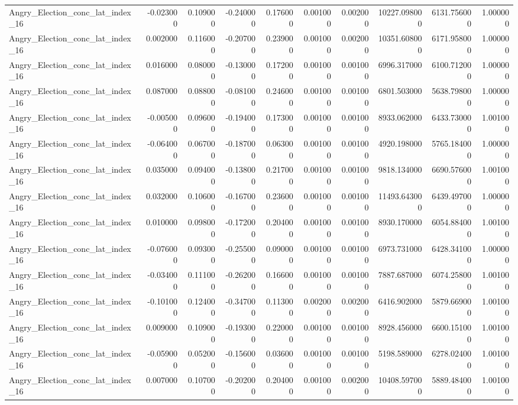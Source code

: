 \begin{table}
\begin{tabular}{lrrrrrrrrr}
Angry_Election_conc_lat_index_16 & -0.023000 & 0.109000 & -0.240000 & 0.176000 & 0.001000 & 0.002000 & 10227.098000 & 6131.756000 & 1.000000 \\
Angry_Election_conc_lat_index_16 & 0.002000 & 0.116000 & -0.207000 & 0.239000 & 0.001000 & 0.002000 & 10351.608000 & 6171.958000 & 1.000000 \\
Angry_Election_conc_lat_index_16 & 0.016000 & 0.080000 & -0.130000 & 0.172000 & 0.001000 & 0.001000 & 6996.317000 & 6100.712000 & 1.000000 \\
Angry_Election_conc_lat_index_16 & 0.087000 & 0.088000 & -0.081000 & 0.246000 & 0.001000 & 0.001000 & 6801.503000 & 5638.798000 & 1.000000 \\
Angry_Election_conc_lat_index_16 & -0.005000 & 0.096000 & -0.194000 & 0.173000 & 0.001000 & 0.001000 & 8933.062000 & 6433.730000 & 1.001000 \\
Angry_Election_conc_lat_index_16 & -0.064000 & 0.067000 & -0.187000 & 0.063000 & 0.001000 & 0.001000 & 4920.198000 & 5765.184000 & 1.000000 \\
Angry_Election_conc_lat_index_16 & 0.035000 & 0.094000 & -0.138000 & 0.217000 & 0.001000 & 0.001000 & 9818.134000 & 6690.576000 & 1.001000 \\
Angry_Election_conc_lat_index_16 & 0.032000 & 0.106000 & -0.167000 & 0.236000 & 0.001000 & 0.001000 & 11493.643000 & 6439.497000 & 1.000000 \\
Angry_Election_conc_lat_index_16 & 0.010000 & 0.098000 & -0.172000 & 0.204000 & 0.001000 & 0.001000 & 8930.170000 & 6054.884000 & 1.001000 \\
Angry_Election_conc_lat_index_16 & -0.076000 & 0.093000 & -0.255000 & 0.090000 & 0.001000 & 0.001000 & 6973.731000 & 6428.341000 & 1.000000 \\
Angry_Election_conc_lat_index_16 & -0.034000 & 0.111000 & -0.262000 & 0.166000 & 0.001000 & 0.001000 & 7887.687000 & 6074.258000 & 1.001000 \\
Angry_Election_conc_lat_index_16 & -0.101000 & 0.124000 & -0.347000 & 0.113000 & 0.002000 & 0.002000 & 6416.902000 & 5879.669000 & 1.001000 \\
Angry_Election_conc_lat_index_16 & 0.009000 & 0.109000 & -0.193000 & 0.220000 & 0.001000 & 0.001000 & 8928.456000 & 6600.151000 & 1.001000 \\
Angry_Election_conc_lat_index_16 & -0.059000 & 0.052000 & -0.156000 & 0.036000 & 0.001000 & 0.001000 & 5198.589000 & 6278.024000 & 1.001000 \\
Angry_Election_conc_lat_index_16 & 0.007000 & 0.107000 & -0.202000 & 0.204000 & 0.001000 & 0.002000 & 10408.597000 & 5889.484000 & 1.001000 \\

\end{tabular}
\end{table}
